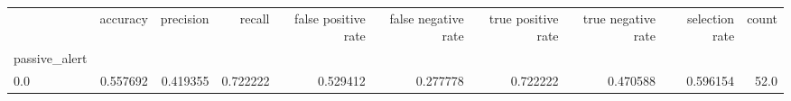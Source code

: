 \begin{tabular}{lrrrrrrrrr}
\toprule
{} &  accuracy &  precision &    recall &  false positive rate &  false negative rate &  true positive rate &  true negative rate &  selection rate &  count \\
passive\_alert &           &            &           &                      &                      &                     &                     &                 &        \\
\midrule
0.0           &  0.557692 &   0.419355 &  0.722222 &             0.529412 &             0.277778 &            0.722222 &            0.470588 &        0.596154 &   52.0 \\
\bottomrule
\end{tabular}

